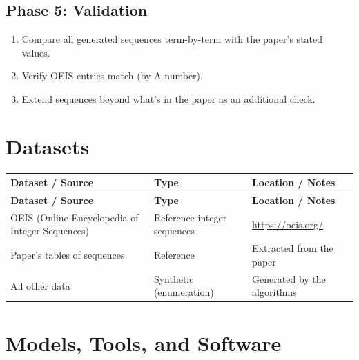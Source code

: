 \documentclass[11pt,a4paper]{article}
\begin{document}
\subsection{Phase 5: Validation}
\begin{enumerate}[label=\textbf{5.\arabic*}]
  \item Compare all generated sequences term-by-term with the paper's stated values.
  \item Verify OEIS entries match (by A-number).
  \item Extend sequences beyond what's in the paper as an additional check.
\end{enumerate}

\section{Datasets}

\begin{longtable}{p{4.5cm} p{3.5cm} p{6cm}}
\toprule
\textbf{Dataset / Source} & \textbf{Type} & \textbf{Location / Notes} \\
\midrule
\endfirsthead
\toprule
\textbf{Dataset / Source} & \textbf{Type} & \textbf{Location / Notes} \\
\midrule
\endhead
OEIS (Online Encyclopedia of Integer Sequences) & Reference integer sequences & \url{https://oeis.org/} \\
\midrule
Paper's tables of sequences & Reference & Extracted from the paper \\
\midrule
All other data & Synthetic (enumeration) & Generated by the algorithms \\
\bottomrule
\end{longtable}

\section{Models, Tools, and Software}
\end{document}
